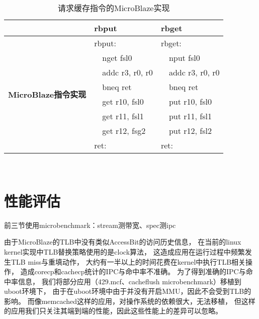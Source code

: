 \begin{table}[htb]
  \centering
  \begin{minipage}[t]{0.6\linewidth}
  \caption{请求缓存指令的MicroBlaze实现}
  \label{tab:pard-dp-isa-impl}
    \begin{tabular*}{\linewidth}{lp{0.5cm}lp{0.5cm}l}
      \toprule[1.5pt]
       & \multicolumn{2}{l}{\textbf{rbput}} & \multicolumn{2}{l}{\textbf{rbget}} \\ 
      \midrule[1pt]

      \multirow{8}{2cm}{\textbf{MicroBlaze指令实现}} & \multicolumn{2}{l}{rbput:}   & \multicolumn{2}{l}{rbget:} \\
                                                   &  & nget fsl0                 &  & nput fsl0               \\
                                                   &  & addc r3, r0, r0           &  & addc r3, r0, r0         \\
                                                   &  & bneq ret                  &  & bneq ret                \\
                                                   &  & get r10, fsl0             &  & put r10, fsl0           \\
                                                   &  & get r11, fsl1             &  & put r11, fsl1           \\
                                                   &  & get r12, fsg2             &  & put r12, fsl2           \\
                                                   & \multicolumn{2}{l}{ret:}     & \multicolumn{2}{l}{ret:}   \\
      \bottomrule[1.5pt]
    \end{tabular*}\\[2pt]
  \end{minipage}
\end{table}


\section{性能评估}

前三节使用microbenchmark：stream测带宽、spec测ipc

由于MicroBlaze的TLB中没有类似AccessBit的访问历史信息，
在当前的linux kernel实现中TLB替换策略使用的是clock算法，
这造成应用在运行过程中频繁发生TLB miss与重填动作，
大约有一半以上的时间花费在kernel中执行TLB相关操作，
造成corecp和cachecp统计的IPC与命中率不准确。
为了得到准确的IPC与命中率信息，
我们将部分应用（429.mcf、cacheflush microbenchmark）移植到uboot环境下，
由于在uboot环境中由于并没有开启MMU，因此不会受到TLB的影响。
而像memcached这样的应用，对操作系统的依赖很大，无法移植，
但这样的应用我们只关注其端到端的性能，因此这些性能上的差异可以忽略。


